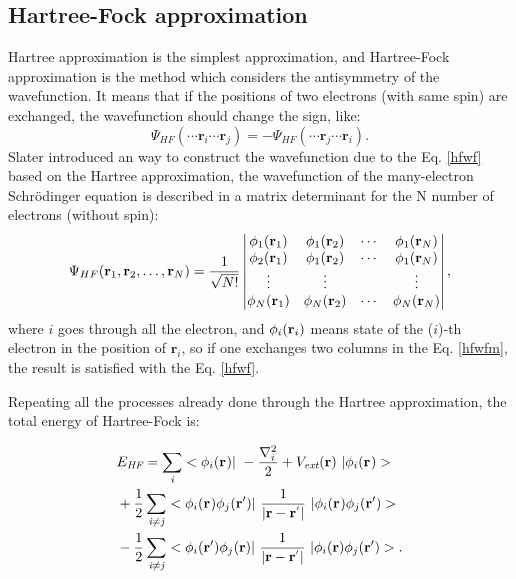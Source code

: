 \documentclass[a4paper, 12pt, titlepage,oneside,drop]{kthesis}
\begin{document}
\subsection{Hartree-Fock approximation}
\noindent Hartree approximation is the simplest approximation, and Hartree-Fock approximation is the method which considers the 
antisymmetry of the wavefunction. It means that if the positions of two electrons (with same spin) are exchanged, the wavefunction should change the sign, like:
\begin{equation}\label{hfwf}
\Psi_\textit{HF} ( \cdots \textbf{r}_\textit{i} \cdots  \textbf{r}_\textit{j} ) = - \Psi_\textit{HF} ( \cdots \textbf{r}_\textit{j} \cdots  \textbf{r}_\textit{i} ).
\end{equation}
\noindent Slater introduced an way to construct the wavefunction due to the Eq. \ref{hfwf} based on the Hartree approximation, 
the wavefunction of the many-electron Schrödinger equation is described in a matrix determinant for the N number of electrons 
(without spin):
\begin{equation}\label{hfwfm}
\Psi_{HF}(\mathbf{r}_1, \mathbf{r}_2, \ldots, \mathbf{r}_N) =
\frac{1}{\sqrt{N!}} \left|
\begin{matrix}
    \bwf<1><1> & \bwf<1><2> & \cdots & \bwf<1><N> \\
    \bwf<2><1> & \bwf<1><2> & \cdots & \bwf<1><N> \\
    \vdots               & \vdots               &        & \vdots               \\
    \bwf<N><1> & \bwf<N><2> & \cdots & \bwf<N><N>
\end{matrix} \right|,
\end{equation}
\noindent where $i$ goes through all the electron, and $\bwf<i><i>$ means state of the ($i$)-th electron in the position of $\textbf{r}_\textit{i}$, so if one exchanges two columns
 in the Eq. \ref{hfwfm}, the result is satisfied with the Eq. \ref{hfwf}.

\noindent Repeating all the processes already done through the Hartree approximation, the total energy of Hartree-Fock is:

\begin{equation}\begin{split}
&E_\textit{HF} = \sumi<i> <\bwf<i><> |\ -\frac{\nabla^{2}_{i}}{2} + V_\textit{ext}(\textbf{r})  \ | \bwf<i><> > \\
& + \frac{1}{2} \suminj<i><j> <\bwf<i><> \bwfn<j><'>|\ \frac{1}{|\textbf{r} - \textbf{r}^{'} |} \ | \bwf<i><> \bwfn<j><'>> \\
& - \frac{1}{2} \suminj<i><j> <\bwfn<i><'> \bwfn<j><>|\ \frac{1}{|\textbf{r} - \textbf{r}^{'} |} \ | \bwfn<i><> \bwfn<j><'>>.
\end{split}\end{equation}
\end{document}
